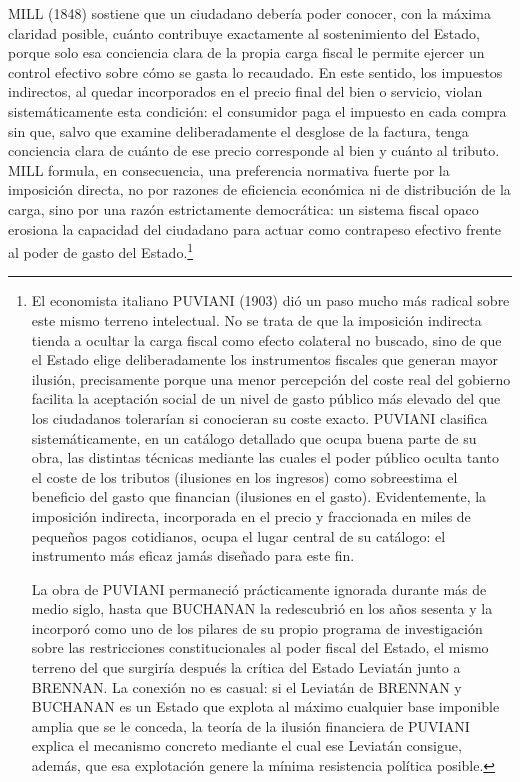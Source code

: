 \documentclass[10pt,a4paper]{article}
\begin{document}
MILL (1848) sostiene que un ciudadano debería poder conocer, con la máxima claridad posible, cuánto contribuye exactamente al sostenimiento del Estado, porque solo esa conciencia clara de la propia carga fiscal le permite ejercer un control efectivo sobre cómo se gasta lo recaudado. En este sentido, los impuestos indirectos, al quedar incorporados en el precio final del bien o servicio, violan sistemáticamente esta condición: el consumidor paga el impuesto en cada compra sin que, salvo que examine deliberadamente el desglose de la factura, tenga conciencia clara de cuánto de ese precio corresponde al bien y cuánto al tributo. MILL formula, en consecuencia, una preferencia normativa fuerte por la imposición directa, no por razones de eficiencia económica ni de distribución de la carga, sino por una razón estrictamente democrática: un sistema fiscal opaco erosiona la capacidad del ciudadano para actuar como contrapeso efectivo frente al poder de gasto del Estado.\footnote{%
    El economista italiano PUVIANI (1903) dió un paso mucho más radical sobre este mismo terreno intelectual. No se trata de que la imposición indirecta tienda a ocultar la carga fiscal como efecto colateral no buscado, sino de que el Estado elige deliberadamente los instrumentos fiscales que generan mayor ilusión, precisamente porque una menor percepción del coste real del gobierno facilita la aceptación social de un nivel de gasto público más elevado del que los ciudadanos tolerarían si conocieran su coste exacto. PUVIANI clasifica sistemáticamente, en un catálogo detallado que ocupa buena parte de su obra, las distintas técnicas mediante las cuales el poder público oculta tanto el coste de los tributos (ilusiones en los ingresos) como sobreestima el beneficio del gasto que financian (ilusiones en el gasto). Evidentemente, la imposición indirecta, incorporada en el precio y fraccionada en miles de pequeños pagos cotidianos, ocupa el lugar central de su catálogo: el instrumento más eficaz jamás diseñado para este fin.

La obra de PUVIANI permaneció prácticamente ignorada durante más de medio siglo, hasta que BUCHANAN la redescubrió en los años sesenta y la incorporó como uno de los pilares de su propio programa de investigación sobre las restricciones constitucionales al poder fiscal del Estado, el mismo terreno del que surgiría después la crítica del Estado Leviatán junto a BRENNAN. La conexión no es casual: si el Leviatán de BRENNAN y BUCHANAN es un Estado que explota al máximo cualquier base imponible amplia que se le conceda, la teoría de la ilusión financiera de PUVIANI explica el mecanismo concreto mediante el cual ese Leviatán consigue, además, que esa explotación genere la mínima resistencia política posible.
}
\end{document}
